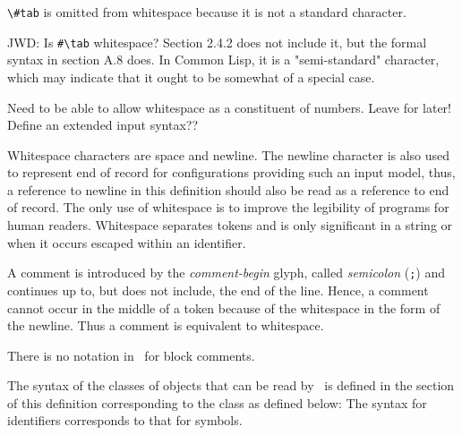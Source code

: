 %
\begin{optPrivate}
    \verb+\#tab+ is omitted from whitespace because it is not a standard
    character.

    JWD: Is \verb+#\tab+ whitespace?  Section 2.4.2 does not include it, but the
    formal syntax in section A.8 does.  In Common Lisp, it is a "semi-standard"
    character, which may indicate that it ought to be somewhat of a special
    case.

    Need to be able to allow whitespace as a constituent of numbers.  Leave for
    later!  Define an extended input syntax??
\end{optPrivate}
%
\begin{optDefinition}
Whitespace characters are space and
newline.  The newline character is also used to represent end of record for
configurations providing such an input model, thus, a reference to newline in
this definition should also be read as a reference to end of record.  The only
use of whitespace is to improve the legibility of programs for human readers.
Whitespace separates tokens and is only significant in a string or when it
occurs escaped within an identifier.

A comment is introduced by the {\em
    comment-begin} glyph,
called {\em semicolon} (\verb+;+) and continues up to, but does not include, the
end of the line.  Hence, a comment cannot occur in the middle of a token because
of the whitespace in the form of the newline.  Thus a comment is equivalent to
whitespace.
%
\begin{note}
    There is no notation in \eulisp\ for block comments.
\end{note}
\end{optDefinition}
%
\begin{optDefinition}
The syntax of the classes of objects that can be read by \eulisp\ is defined in
the section of this definition corresponding to the class as defined below:
%
\Syntax
\label{object-syntax}
%
The syntax for identifiers 
 corresponds to that for symbols.
%
\end{optDefinition}
